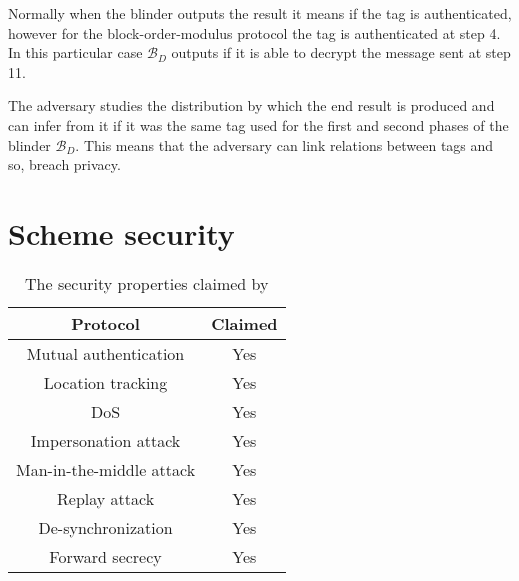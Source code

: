 \begin{adjustwidth}{-60pt}{}
{    \< \<  \\[-1ex]
    \< \<  \\[-4ex]
    \<  \< \\[-4ex]
     \\[-1ex]
    \\[-1ex]
    }
    \end{adjustwidth}

    Normally when the blinder outputs the result it means if the tag is authenticated, however for the block-order-modulus protocol 
    the tag is authenticated at step 4. In this particular case $\mathcal{B}_D$ outputs if it is able to decrypt the message sent at step 11.
    
    The adversary studies the distribution by which the end result is produced and can infer from it if it was the same tag used for the first
    and second phases of the blinder $\mathcal{B}_D$. This means that the adversary can link relations between tags and so, breach privacy.
    

\section{Scheme security}
\begin{table}[H]
    \centering
    \caption{The security properties claimed by \cite{BOM}}
    \begin{tabular}{| c | c |}
        \hline
        Protocol & Claimed \\
        \hline
        Mutual authentication & Yes \\
        Location tracking & Yes \\
        DoS & Yes \\
        Impersonation attack & Yes  \\
        Man-in-the-middle attack & Yes  \\
        Replay attack & Yes  \\
        De-synchronization & Yes  \\
        Forward secrecy & Yes \\
        \hline
    \end{tabular}
\end{table}

